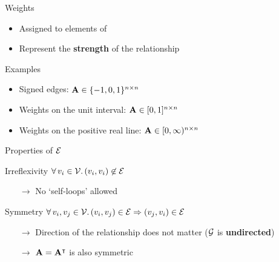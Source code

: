 \begin{frame}{Weights}
    \begin{itemize}
        \item Assigned to elements of 
        \item Represent the \textbf{strength} of the relationship
    \end{itemize}
    \vfill
    \begin{block}{Examples}
        \begin{itemize}
            \item Signed edges:
                  $\mathbf{A} \in \{ -1, 0, 1 \}^{n \times n}$
            \item Weights on the unit interval:
                  $\mathbf{A} \in [ 0, 1 ]^{n \times n}$
            \item Weights on the positive real line:
                  $\mathbf{A} \in [ 0, \infty )^{n \times n}$
        \end{itemize}
    \end{block}
\end{frame}

\begin{frame}{Properties of $\mathcal{E}$}
    \begin{block}{Irreflexivity}
        \centering
        $\forall\, v_{i} \in \mathcal{V}.\, (v_{i}, v_{i}) \not \in \mathcal{E}$
        \begin{itemize}
            \item[$\rightarrow$] No `self\hyp{}loops' allowed
        \end{itemize}
    \end{block}
    \vfill
    \begin{block}{Symmetry}
        \centering
        $\forall\, v_{i}, v_{j} \in \mathcal{V}.\, (v_{i}, v_{j}) \in \mathcal{E} \Rightarrow (v_{j}, v_{i}) \in \mathcal{E}$
        \begin{itemize}
            \item[$\rightarrow$] Direction of the relationship does not matter
                                 ($\mathcal{G}$ is \textbf{undirected})
            \item[$\rightarrow$] $\mathbf{A} = \mathbf{A}^{\intercal}$ is also symmetric
        \end{itemize}
    \end{block}
\end{frame}

